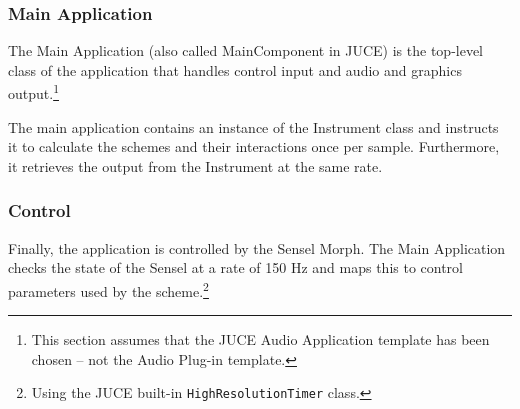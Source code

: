 \subsubsection{Main Application}
The Main Application (also called MainComponent in JUCE) is the top-level class of the application that handles control input and audio and graphics output.\footnote{This section assumes that the JUCE Audio Application template has been chosen -- not the Audio Plug-in template.}

The main application contains an instance of the Instrument class and instructs it to calculate the schemes and their interactions once per sample. Furthermore, it retrieves the output from the Instrument at the same rate.


\subsubsection{Control}
Finally, the application is controlled by the Sensel Morph. The Main Application checks the state of the Sensel at a rate of 150 Hz and maps this to control parameters used by the scheme.\footnote{Using the JUCE built-in \texttt{HighResolutionTimer} class.}








